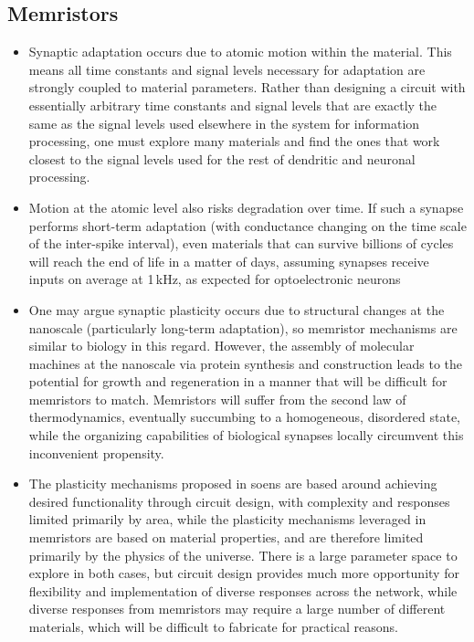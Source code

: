 \documentclass[onecolumn]{article}
\begin{document}
\subsection{Memristors}

\begin{itemize}

\item Synaptic adaptation occurs due to atomic motion within the material. This means all time constants and signal levels necessary for adaptation are strongly coupled to material parameters. Rather than designing a circuit with essentially arbitrary time constants and signal levels that are exactly the same as the signal levels used elsewhere in the system for information processing, one must explore many materials and find the ones that work closest to the signal levels used for the rest of dendritic and neuronal processing.

\item Motion at the atomic level also risks degradation over time. If such a synapse performs short-term adaptation (with conductance changing on the time scale of the inter-spike interval), even materials that can survive billions of cycles will reach the end of life in a matter of days, assuming synapses receive inputs on average at 1\,kHz, as expected for optoelectronic neurons

\item One may argue synaptic plasticity occurs due to structural changes at the nanoscale (particularly long-term adaptation), so memristor mechanisms are similar to biology in this regard. However, the assembly of molecular machines at the nanoscale via protein synthesis and construction leads to the potential for growth and regeneration in a manner that will be difficult for memristors to match. Memristors will suffer from the second law of thermodynamics, eventually succumbing to a homogeneous, disordered state, while the organizing capabilities of biological synapses locally circumvent this inconvenient propensity.

\item The plasticity mechanisms proposed in soens are based around achieving desired functionality through circuit design, with complexity and responses limited primarily by area, while the plasticity mechanisms leveraged in memristors are based on material properties, and are therefore limited primarily by the physics of the universe. There is a large parameter space to explore in both cases, but circuit design provides much more opportunity for flexibility and implementation of diverse responses across the network, while diverse responses from memristors may require a large number of different materials, which will be difficult to fabricate for practical reasons.


\end{itemize}
\end{document}
